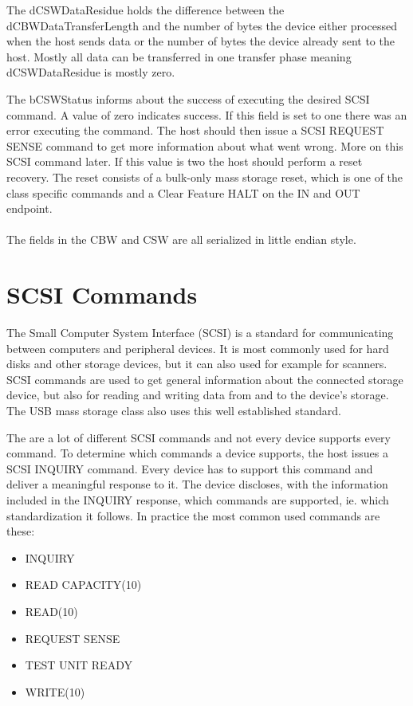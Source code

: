 \newpage

The dCSWDataResidue holds the difference between the dCBWDataTransferLength and the number of bytes the device either processed when the host sends data or the number of bytes the device already sent to the host. Mostly all data can be transferred in one transfer phase meaning dCSWDataResidue is mostly zero.

The bCSWStatus informs about the success of executing the desired SCSI command. A value of zero indicates success. If this field is set to one there was an error executing the command. The host should then issue a SCSI REQUEST SENSE command to get more information about what went wrong\cite{usb_ms_jan}. More on this SCSI command later. If this value is two the host should perform a reset recovery. The reset consists of a bulk-only mass storage reset, which is one of the class specific commands and a Clear Feature HALT on the IN and OUT endpoint\cite{usb_ms_jan, usb_mass_bulk}.
\\\\
The fields in the CBW and CSW are all serialized in little endian style.

\section{SCSI Commands}
\label{section:scsi_commands}

The Small Computer System Interface (SCSI) is a standard for communicating between computers and peripheral devices. It is most commonly used for hard disks and other storage devices, but it can also used for example for scanners\cite{wiki_scsi}. SCSI commands are used to get general information about the connected storage device, but also for reading and writing data from and to the device's storage. The USB mass storage class also uses this well established standard.

The are a lot of different SCSI commands and not every device supports every command. To determine which commands a device supports, the host issues a SCSI INQUIRY command. Every device has to support this command and deliver a meaningful response to it. The device discloses, with the information included in the INQUIRY response, which commands are supported, ie. which standardization it follows. In practice the most common used commands are these\cite{usb_ms_jan}:

\begin{itemize}
\item INQUIRY
\item READ CAPACITY(10)
\item READ(10)
\item REQUEST SENSE
\item TEST UNIT READY
\item WRITE(10)
\end{itemize}

